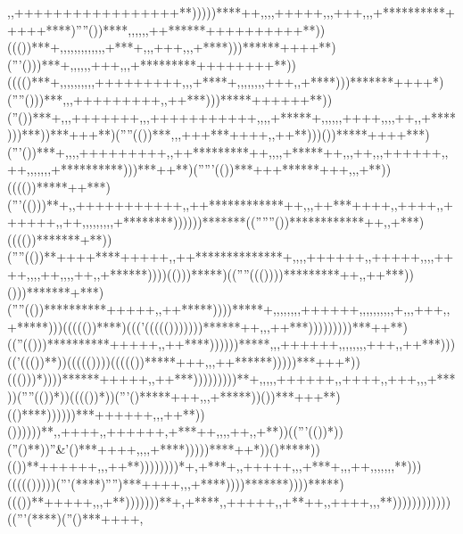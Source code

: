               ,,+++++++++++++++++**)))))****++,                                    ,                ,,+++++,                                                        ,,+++,                                  ,,+**********+++++****)''''())****,          ,,,,                 ,++******++++++++++**))((())***+,                                  ,,,,,,,,,,          ,,+***+,,                                                       ,+++,,                                  ,+****)))******++++**)('''()))***+,    ,,,,,+++,                ,,+*********++++++++**))(((()***+,       ,,,,,,,                   ,,+++++++++,,         ,+****+,,                                        ,,,,          ,,+++,                                  ,+****)))*******++++*)(''''()))***,  ,,+++++++++,               ,++***)))*****++++++**))(''())***+,    ,,+++++++,                 ,,+++++++++++,,       ,,+*****+,,          ,,                         ,,++++,,         ,,++,                                  ,+****)))***))***+++**)(''''(())***,,,+++***++++,               ,++**)))())*****++++***)('''())***+,, ,,+++++++++,                ,++*********++,,      ,,+*****++,        ,,++,,                       ,++++++,          ,++,,,,,,                             ,+**********)))***++**)('''''(())***+++******+++,               ,,+**))(((())*****++***)('''(()))**+,,+++++++++++,               ,++************++,     ,,++***++++,       ,++++,                       ,++++++,          ,++,,,,,,          ,,,                 +********))))))*******((''''''())************++,                ,+***)(((())*******+**))(''''(())**++++****+++++,               ,++**************+,     ,,,++++++,       ,+++++,,                      ,,++++,,         ,,++,   ,,         ,++,                 ,+******))))(()))*****)((''''((())))*********++,                ,++***))()))*******+***)(''''(())**********+++++,                ,++*****))))*****+,       ,,,,,,        ,++++++,                      ,,,,,,,,          ,+,,              ,+++,                 ,+*****)))((((())****)((('((((()))))))******++,                ,,++***)))))))))***++**)((''(()))**********+++++,                ,++****))))))*****,                    ,,++++++,                            ,,,,,        ,                ,+++,                  ,++***)))(('((())**))((((())))((((())*****+++,                 ,,++******)))))***+++*))((()))*))))******+++++,                  ,++***)))))))))**+              ,,,   ,,++++++,                            ,++++,                        ,+++,,                   ,+***))(''''(())*))(((())*))('''()*****+++,                    ,,+*****))())***+++**)(()****))))))***++++++,                  ,,++**))())))))**,             ,++++,  ,++++++,                            +***++,               ,,       ,++,                     ,+**))(('''(())*))(''()**))''&'()***++++,,                     ,,+****)))))****++*))()*****))(())**++++++,                    ,,++**))))))))*+,             +***+,  ,+++++,,                           ,+***+,              ,,++,,     ,,,,                      ,**)))((((()))))('''(****)'''')***++++,,                        ,+****))))*******))))*****)((())**+++++,,                      ,+**)))))))**+             ,+****,  ,+++++,                            ,+**++,              ,++++,,                              ,**))))))))))))(('''(****)(''()***++++,             